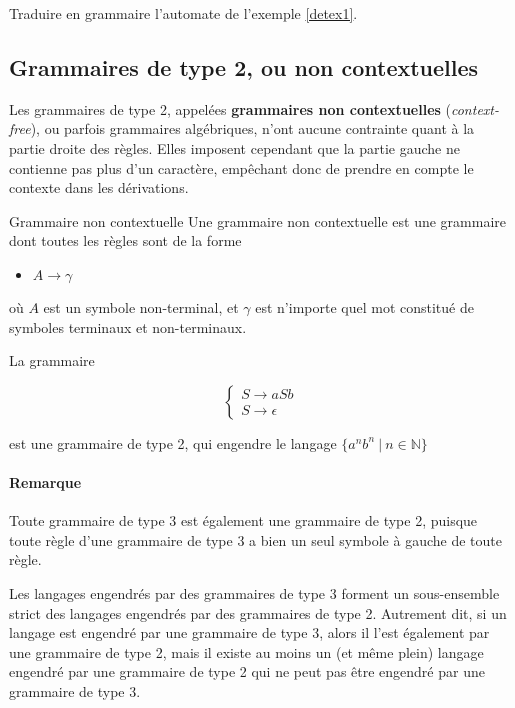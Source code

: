\begin{exercice}
Traduire en grammaire l'automate de l'exemple \ref{detex1}.
\end{exercice}



\subsection{Grammaires de type 2, ou non contextuelles}

Les grammaires de type 2, appelées \textbf{grammaires non contextuelles} (\textit{context-free}), ou parfois grammaires algébriques, n'ont aucune contrainte quant à la partie droite des règles. Elles imposent cependant que la partie gauche ne contienne pas plus d'un caractère, empêchant donc de prendre en compte le contexte dans les dérivations.

\begin{definition}{Grammaire non contextuelle}{}
Une grammaire non contextuelle est une grammaire dont toutes les règles sont de la forme 
\begin{itemize}
\item[] $A \rightarrow \gamma$
\end{itemize}
où $A$ est un symbole non-terminal, et $\gamma$ est n'importe quel mot constitué de symboles terminaux et non-terminaux.
\end{definition}

\begin{example}
\label{gramanbn}
La grammaire 

\[
\begin{cases}
S \rightarrow aSb \\
S \rightarrow \epsilon
\end{cases}
\]

est une grammaire de type 2, qui engendre le langage $\{a^nb^n ~|~n \in \mathbb{N}\}$
\end{example}

\paragraph{Remarque} Toute grammaire de type 3 est également une grammaire de type 2, puisque toute règle d'une grammaire de type 3 a bien un seul symbole à gauche de toute règle.

\begin{lemma}
Les langages engendrés par des grammaires de type 3 forment un sous-ensemble strict des langages engendrés par des grammaires de type 2. Autrement dit, si un langage est engendré par une grammaire de type 3, alors il l'est également par une grammaire de type 2, mais il existe au moins un (et même plein) langage engendré par une grammaire de type 2 qui ne peut pas être engendré par une grammaire de type 3.  
\end{lemma}

